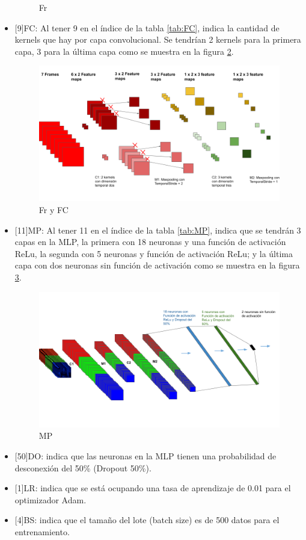 \begin{onehalfspacing}
\begin{itemize}
\begin{figure}[h!]
    	\caption{\footnotesize  Fr}
    	\label{fig:Fig_Fr}
    \end{figure}
     \item {[9]FC}: Al tener 9 en el índice de la tabla \ref{tab:FC}, indica la cantidad de kernels que hay por capa convolucional. Se tendrían 2 kernels para la primera capa, 3 para la última capa como se muestra en la figura \ref{fig:Fig_FrFC}.
     \begin{figure}[h!]
    	\centering
    	\includegraphics[width=13cm,keepaspectratio]{XX_Figures/Fig_FrFC.png}
    	\caption{\footnotesize  Fr y FC}
    	\label{fig:Fig_FrFC}
    \end{figure}
     \item {[11]MP}: Al tener 11 en el índice de la tabla \ref{tab:MP}, indica que se tendrán 3 capas en la MLP, la primera con 18 neuronas y una función de activación ReLu, la segunda con 5 neuronas y función de activación ReLu; y la última capa con dos neuronas sin función de activación como se muestra en la figura \ref{fig:Fig_MP}.
     \begin{figure}[h!]
    	\centering
    	\includegraphics[width=15cm,keepaspectratio]{XX_Figures/Fig_MP.png}
    	\caption{\footnotesize  MP}
    	\label{fig:Fig_MP}
    \end{figure}
     \item {[50]DO}: indica que las neuronas en la MLP tienen una probabilidad de desconexión del 50\% (Dropout 50\%).
     \item {[1]LR}: indica que se está ocupando una tasa de aprendizaje de 0.01 para el optimizador Adam.
     \item {[4]BS}: indica que el tamaño del lote (batch size) es de 500 datos para el entrenamiento.
 \end{itemize}
 


\end{onehalfspacing}
